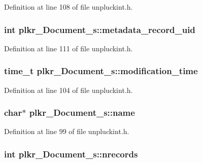 Definition at line 108 of file unpluckint.\+h.

\hypertarget{structplkr__Document__s_a19ab77ee9af9fe9a77aa06713b84a750}{
\subsubsection[{metadata\+\_\+record\+\_\+uid}]{\setlength{\rightskip}{0pt plus 5cm}int plkr\+\_\+\+Document\+\_\+s\+::metadata\+\_\+record\+\_\+uid}}\label{structplkr__Document__s_a19ab77ee9af9fe9a77aa06713b84a750}


Definition at line 111 of file unpluckint.\+h.

\hypertarget{structplkr__Document__s_ab595a6fc74557f08e01385622469183f}{
\subsubsection[{modification\+\_\+time}]{\setlength{\rightskip}{0pt plus 5cm}time\+\_\+t plkr\+\_\+\+Document\+\_\+s\+::modification\+\_\+time}}\label{structplkr__Document__s_ab595a6fc74557f08e01385622469183f}


Definition at line 104 of file unpluckint.\+h.

\hypertarget{structplkr__Document__s_a40733c5478612b5565a4e0155a01bdc6}{
\subsubsection[{name}]{\setlength{\rightskip}{0pt plus 5cm}char$\ast$ plkr\+\_\+\+Document\+\_\+s\+::name}}\label{structplkr__Document__s_a40733c5478612b5565a4e0155a01bdc6}


Definition at line 99 of file unpluckint.\+h.

\hypertarget{structplkr__Document__s_a133abbdd399b433991b5e561339990f7}{
\subsubsection[{nrecords}]{\setlength{\rightskip}{0pt plus 5cm}int plkr\+\_\+\+Document\+\_\+s\+::nrecords}}\label{structplkr__Document__s_a133abbdd399b433991b5e561339990f7}


